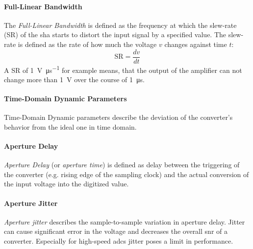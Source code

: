 \paragraph{Full-Linear Bandwidth}
The \textit{Full-Linear Bandwidth} is defined as the frequency at which the slew-rate (SR) of the \gls{sha} starts to distort the input signal by a specified value. \cite{Lundberg} The slew-rate is defined as the rate of how much the voltage $v$ changes against time $t$:
\begin{equation}
	\text{SR} = \frac{dv}{dt}
\end{equation}
A SR of \SI{1}{\volt \per \micro \second} for example means, that the output of the amplifier can not change more than \SI{1}{\volt} over the course of \SI{1}{\micro \second}.\cite{2021Slew} 

\paragraph{Time-Domain Dynamic Parameters}
Time-Domain Dynamic parameters describe the deviation of the converter's behavior from the ideal one in time domain. 

\paragraph{Aperture Delay}
\textit{Aperture Delay} (or \textit{aperture time}) is defined as delay between the triggering of the converter (e.g. rising edge of the sampling clock) and the actual conversion of the input voltage into the digitized value. \cite{Lundberg}

\paragraph{Aperture Jitter}
\textit{Aperture jitter} describes the sample-to-sample variation in aperture delay. Jitter can cause significant error in the voltage and decreases the overall \gls{snr} of a converter. Especially for high-speed \glspl{adc} jitter poses a limit in performance.

